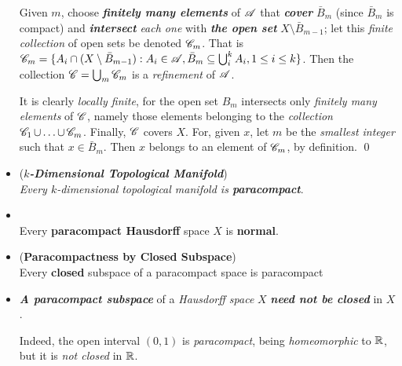 \documentclass[11pt]{article}
\begin{document}
\begin{itemize}
\begin{example}
Given $m$, choose \emph{\textbf{finitely many elements}} of ${\mathscr A}$ that \emph{\textbf{cover}} $\bar{B}_m$ (since $\bar{B}_m$ is compact) and
\emph{\textbf{intersect}} \emph{each one} with \emph{\textbf{the open set}} $X \setminus \bar{B}_{m-1}$; let this \emph{finite collection} of open sets be denoted ${\mathscr C}_m$. That is ${\mathscr C}_{m} =\{ A_{i} \cap (X \setminus \bar{B}_{m-1}): A_i \in {\mathscr A}, \bar{B}_m \subseteq \bigcup_i^{k} A_i, 1\le i \le k  \}$.
Then the collection ${\mathscr C} = \bigcup_{m}{\mathscr C}_m$ is a \emph{refinement} of ${\mathscr A}$. 

It is clearly \emph{locally finite}, for the open set $B_m$ intersects only \emph{finitely many elements} of ${\mathscr C}$, namely those elements belonging to the \emph{collection} ${\mathscr C}_1 \,{\cup}\ldots{\cup}\, {\mathscr C}_m$. Finally, ${\mathscr C}$ covers $X$. For, given $x$, let $m$ be the \emph{smallest integer} such that $x \in \bar{B}_m$. Then $x$ belongs to an element of ${\mathscr C}_m$, by definition. \qed
\end{example}

\item \begin{example}(\textbf{\emph{$k$-Dimensional Topological Manifold}}) \\
\emph{Every $k$-dimensional topological manifold is \textbf{paracompact}}.
\end{example}

\item \begin{theorem}\citep{munkres2000topology}\\
Every \textbf{paracompact Hausdorff} space $X$ is \textbf{normal}.
\end{theorem}

\item \begin{proposition}(\textbf{Paracompactness by Closed Subspace}) \citep{munkres2000topology}\\
Every \textbf{closed} subspace of a paracompact space is paracompact
\end{proposition}

\item \begin{remark}
\emph{\textbf{A paracompact subspace}} of a \emph{Hausdorff space} $X$ \emph{\textbf{need not be closed}} in $X$.

Indeed, the open interval $(0, 1)$ is \emph{paracompact}, being \emph{homeomorphic} to ${\mathbb R}$, but it is \emph{not closed} in ${\mathbb R}$.
\end{remark}


\end{itemize}
\end{document}

